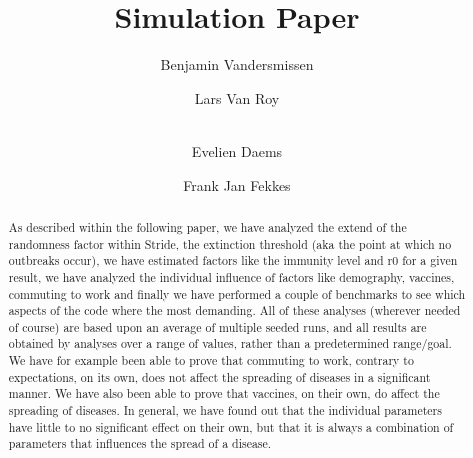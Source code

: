 \documentclass[runningheads]{llncs}
\begin{document}
	\title{Simulation Paper}
	
	\author{Benjamin Vandersmissen \and
		Lars Van Roy \and \\
		Evelien Daems \and
		Frank Jan Fekkes}
	\maketitle              %
	\begin{abstract}
		As described within the following paper, we have analyzed the extend of the randomness factor within Stride, the extinction threshold (aka the point at which no outbreaks occur), we have estimated factors like the immunity level and r0 for a given result, we have analyzed the individual influence of factors like demography, vaccines, commuting to work and finally we have performed a couple of benchmarks to see which aspects of the code where the most demanding. All of these analyses (wherever needed of course) are based upon an average of multiple seeded runs, and all results are obtained by analyses over a range of values, rather than a predetermined range/goal. We have for example been able to prove that commuting to work, contrary to expectations, on its own, does not affect the spreading of diseases in a significant manner. We have also been able to prove that vaccines, on their own, do affect the spreading of diseases. In general, we have found out that the individual parameters have little to no significant effect on their own, but that it is always a combination of parameters that influences the spread of a disease.

		
		
	\end{abstract}
	
	
\end{document}
